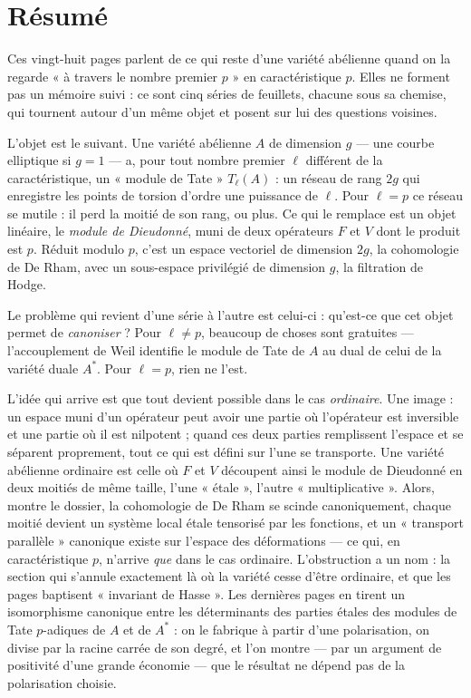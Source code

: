 \documentclass[11pt,a4paper]{article}
\begin{document}
\section*{Résumé}

\begin{resume}
Ces vingt-huit pages parlent de ce qui reste d'une variété abélienne quand on
la regarde « à travers le nombre premier $p$ » en caractéristique $p$. Elles ne
forment pas un mémoire suivi : ce sont cinq séries de feuillets, chacune sous
sa chemise, qui tournent autour d'un même objet et posent sur lui des questions
voisines.

L'objet est le suivant. Une variété abélienne $A$ de dimension $g$ --- une
courbe elliptique si $g = 1$ --- a, pour tout nombre premier $\ell$ différent de
la caractéristique, un « module de Tate » $T_\ell(A)$ : un réseau de rang $2g$
qui enregistre les points de torsion d'ordre une puissance de $\ell$. Pour
$\ell = p$ ce réseau se mutile : il perd la moitié de son rang, ou plus. Ce qui
le remplace est un objet linéaire, le \emph{module de Dieudonné}, muni de deux
opérateurs $F$ et $V$ dont le produit est $p$. Réduit modulo $p$, c'est
un espace vectoriel de dimension $2g$, la cohomologie de De Rham, avec un
sous-espace privilégié de dimension $g$, la filtration de Hodge.

Le problème qui revient d'une série à l'autre est celui-ci : qu'est-ce que
cet objet permet de \emph{canoniser} ? Pour $\ell \neq p$, beaucoup de choses
sont gratuites --- l'accouplement de Weil identifie le module de Tate de $A$
au dual de celui de la variété duale $A^*$. Pour $\ell = p$, rien ne l'est.

L'idée qui arrive est que tout devient possible dans le cas \emph{ordinaire}.
Une image : un espace muni d'un opérateur peut avoir une partie où
l'opérateur est inversible et une partie où il est nilpotent ; quand ces
deux parties remplissent l'espace et se séparent proprement, tout ce qui est
défini sur l'une se transporte. Une variété abélienne ordinaire est celle où
$F$ et $V$ découpent ainsi le module de Dieudonné en deux moitiés de même
taille, l'une « étale », l'autre « multiplicative ». Alors, montre le
dossier, la cohomologie de De Rham se scinde canoniquement, chaque moitié
devient un système local étale tensorisé par les fonctions, et un
« transport parallèle » canonique existe sur l'espace des déformations ---
ce qui, en caractéristique $p$, n'arrive \emph{que} dans le cas ordinaire.
L'obstruction a un nom : la section qui s'annule exactement là où la variété
cesse d'être ordinaire, et que les pages baptisent « invariant de Hasse ».
Les dernières pages en tirent un isomorphisme canonique entre les
déterminants des parties étales des modules de Tate $p$-adiques de $A$ et de
$A^*$ : on le fabrique à partir d'une polarisation, on divise par la racine
carrée de son degré, et l'on montre --- par un argument de positivité d'une
grande économie --- que le résultat ne dépend pas de la polarisation choisie.


\end{resume}
\end{document}
